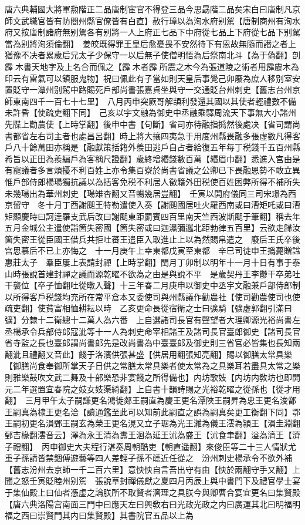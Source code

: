 唐六典輔國大將軍勲階正二品唐制宦官不得登三品今思勗階二品矣宋白曰唐制凡京師文武職官皆有防閤州縣官僚皆有白直】赦行璋以為洵水府别駕【唐制商州有洵水府又按唐制諸府無别駕各有别將一人上府正七品下中府從七品上下府從七品下别駕當為别將洵須倫翻】　姜皎既得罪王皇后愈憂畏不安然待下有恩故無隨而譖之者上猶豫不决者累歲后兄太子少保守一以后無子使僧明悟為后祭南北斗【為于偽翻】剖霹木書天地字及上名合而佩之【霹木者霹所震之木今為張道陵之術者用霹靂木為印云有雷氣可以鎮服鬼物】祝曰佩此有子當如則天皇后事覺己卯廢為庶人移别室安置貶守一潭州别駕中路賜死戶部尚書張嘉貞坐與守一交通貶台州刺史【舊志台州京師東南四千一百七十七里】　八月丙申突厥哥解頡利發還其國以其使者輕禮數不備未許昏【使疏吏翻下同】　己亥以宇文融為御史中丞融乘驛周流天下事無大小諸州先牒上勸農使【上時掌翻】後申中書【句斷】省司亦待融指撝然後處决【省司謂尚書都省左右司主者也處昌呂翻】時上將大攘四夷急于用度州縣畏融多張虛數凡得客戶八十餘萬田亦稱是【融獻策括籍外羨田逃戶自占者給復五年每丁税錢千五百州縣希旨以正田為羨編戶為客稱尺證翻】歲終增緡錢數百萬【緡眉巾翻】悉進入宫由是有寵議者多言煩擾不利百姓上亦令集百寮於尚書省議之公卿已下畏融恩勢不敢立異惟戶部侍郎楊瑒獨抗議以為括客免税不利居人徵籍外田税使百姓困弊所得不補所失未幾瑒出為華州刺史【瑒雉杏翻又音暢幾居豈翻】　壬寅以開府儀同三司宋璟為西京留守　冬十月丁酉謝䫻王特勒遣使入奏【謝䫻國居吐火羅西南或曰漕矩吒或曰漕矩顯慶時曰訶逹羅支武后改曰謝䫻東距罽賓四百里南天竺西波斯䫻于筆翻】稱去年五月金城公主遣使詣箇失密國【箇失密或曰迦濕彌邏北距勃律五百里】云欲走歸汝箇失密王從臣國王借兵共拒吐蕃王遣臣入取進止上以為然賜帛遣之　廢后王氏卒後宫思慕后不已上亦悔之　十一月庚午上幸東都戊寅至東都　辛巳司徒申王撝薨贈諡惠莊太子　羣臣屢上表請封禪【上時掌翻】閏月丁卯制以明年十一月十日有事于泰山時張說首建封禪之議而源乾曜不欲為之由是與說不平　是歲契丹王李鬱干卒弟吐干襲位【卒子恤翻吐從暾入聲】十三年春二月庚申以御史中丞宇文融兼戶部侍郎制以所得客戶税錢均充所在常平倉本又委使司與州縣議作勸農社【使司勸農使司也使疏吏翻】使貧富相恤耕耘以時　乙亥更命長從宿衛之士曰彍騎【彍虚郭翻引滿曰彍】分隸十二衛總十二萬人為六番　上自選諸司長官有聲望者大理卿源光裕尚書左丞楊承令兵部侍郎寇泚等十一人為刺史命宰相諸王及諸司長官臺郎御史【諸司長官省寺監之長也臺郎謂尚書郎先是改尚書為中臺臺郎及御史則三省官必皆集也長知兩翻泚且禮翻又音此】餞于洛濱供張甚盛【供居用翻張知亮翻】賜以御膳太常具樂【御膳尚食奉御所掌天子日供之常膳太常具樂者使太常為之具樂耳若盡具太常之樂則雅樂鼔吹文武二舞及十部樂恐非宴餞之所得備也】内坊歌妓【内坊内敎坊也即開元二年選置宜春院之妓女妓渠綺翻】上自書十韻詩賜之光裕乾曜之從孫也【從才用翻】　三月甲午太子嗣謙更名鴻徙郯王嗣直為慶王更名潭陜王嗣昇為忠王更名浚鄫王嗣真為棣王更名洽【讀通鑑至此可以知前此嗣直之誤為嗣真矣更工衡翻下同】鄂王嗣初更名溳鄄王嗣玄為榮王更名滉又立子琚為光王濰為儀王澐為潁王【溳圭淵翻鄄吉椽翻澐音云】澤為永王清為夀王洄為延王沭為盛王【沭食聿翻】溢為濟王【濟子禮翻】　丙申御史大夫程行湛奏周朝酷吏【朝直遥翻】來俊臣等二十三人情狀尤重子孫請皆禁錮傅遊藝等四人差輕子孫不聼近任從之　汾州刺史楊承令不欲外補【舊志汾州去京師一千二百六里】意怏怏自言吾出守有由【怏於兩翻守手又翻】上聞之怒壬寅貶睦州别駕　張說草封禪儀獻之夏四月丙辰上與中書門下及禮官學士宴于集仙殿上曰仙者憑虚之論朕所不取賢者濟理之具朕今與卿曹合宴宜更名曰集賢殿【唐六典洛陽宫南面三門中曰應天左曰興敎右曰光政光政之内曰廣運其北曰明福明福之西曰崇賢門其内曰集賢殿】其書院官五品以上為